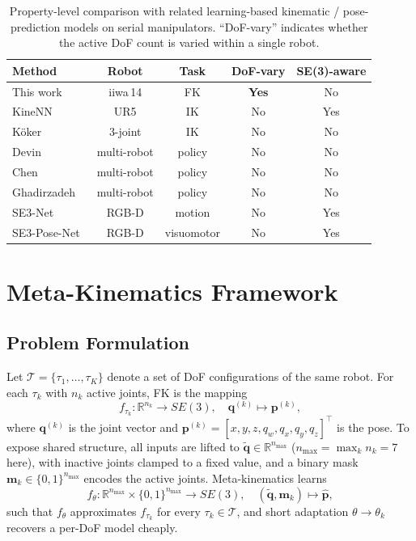 \documentclass[conference]{IEEEtran}
\begin{document}
\begin{table}[!t]
\renewcommand{\arraystretch}{1.15}
\caption{Property-level comparison with related learning-based kinematic / pose-prediction models on serial manipulators. ``DoF-vary'' indicates whether the active DoF count is varied within a single robot.}
\label{tab:propcomp}
\centering
\footnotesize
\begin{tabular}{lcccc}
\toprule
Method & Robot & Task & DoF-vary & SE(3)-aware \\
\midrule
This work & iiwa\,14 & FK & \textbf{Yes} & No \\
KineNN~\cite{diprasetya2025} & UR5 & IK & No & Yes \\
K{\"o}ker~\cite{koker2004} & 3-joint & IK & No & No \\
Devin~\cite{devin2017} & multi-robot & policy & No & No \\
Chen~\cite{chen2018} & multi-robot & policy & No & No \\
Ghadirzadeh~\cite{ghadirzadeh2021} & multi-robot & policy & No & No \\
SE3-Net~\cite{byravan2017} & RGB-D & motion & No & Yes \\
SE3-Pose-Net~\cite{byravan2018} & RGB-D & visuomotor & No & Yes \\
\bottomrule
\end{tabular}
\end{table}

\section{Meta-Kinematics Framework}\label{sec:method}

\subsection{Problem Formulation}

Let $\mathcal{T} = \{\tau_1,\dots,\tau_K\}$ denote a set of DoF configurations of the same robot. For each $\tau_k$ with $n_k$ active joints, FK is the mapping
\begin{equation}
f_{\tau_k}:\mathbb{R}^{n_k}\!\rightarrow\! SE(3),\quad \mathbf{q}^{(k)}\!\mapsto\! \mathbf{p}^{(k)},
\label{eq:fk}
\end{equation}
where $\mathbf{q}^{(k)}$ is the joint vector and $\mathbf{p}^{(k)}\!=\![x,y,z,q_w,q_x,q_y,q_z]^\top$ is the pose. To expose shared structure, all inputs are lifted to $\tilde{\mathbf{q}}\!\in\!\mathbb{R}^{n_{\max}}$ ($n_{\max}\!=\!\max_k n_k\!=\!7$ here), with inactive joints clamped to a fixed value, and a binary mask $\mathbf{m}_k\!\in\!\{0,1\}^{n_{\max}}$ encodes the active joints. Meta-kinematics learns
\begin{equation}
f_\theta:\mathbb{R}^{n_{\max}}\!\times\!\{0,1\}^{n_{\max}}\!\rightarrow\! SE(3),\quad (\tilde{\mathbf{q}},\mathbf{m}_k)\!\mapsto\!\hat{\mathbf{p}},
\label{eq:meta}
\end{equation}
such that $f_\theta$ approximates $f_{\tau_k}$ for every $\tau_k\!\in\!\mathcal{T}$, and short adaptation $\theta\!\rightarrow\!\theta_k$ recovers a per-DoF model cheaply.
\end{document}
